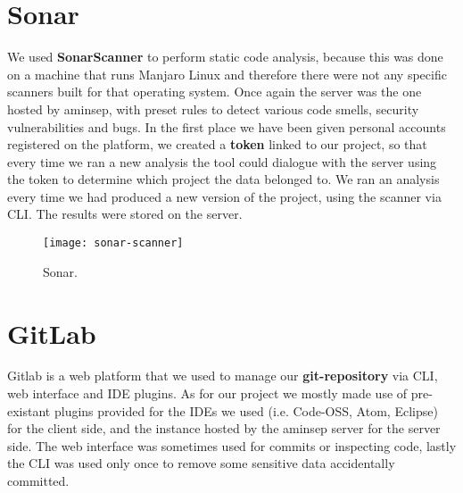 \documentclass[a4paper,10pt]{report}
\begin{document}
\section{Sonar} %
We used \textbf{SonarScanner} to perform static code analysis, because this was done on a machine that runs Manjaro Linux and therefore there were not any specific scanners built for that operating system. Once again the server was the one hosted by aminsep, with preset rules to detect various code smells, security vulnerabilities and bugs. 
In the first place we have been given personal accounts registered on the platform, we created a \textbf{token} linked to our project, so that every time we ran a new analysis the tool could dialogue with the server using the token to determine which project the data belonged to.
We ran an analysis every time we had produced a new version of the project, using the scanner via CLI. The results were stored on the server.

\begin{figure}[H]
	\centering
    \texttt{[image: sonar-scanner]}
    \caption{Sonar.}
    \label{fig:sonar}
\end{figure}
\section[GitLab] {GitLab} %
Gitlab is a web platform that we used to manage our \textbf{git-repository} via CLI, web interface and IDE plugins.
As for our project we mostly made use of pre-existant plugins provided for the IDEs we used (i.e. Code-OSS, Atom, Eclipse) for the client side, and the instance hosted by the aminsep server for the server side. The web interface was sometimes used for commits or inspecting code, lastly the CLI was used only once to remove some sensitive data accidentally committed.
\end{document}
